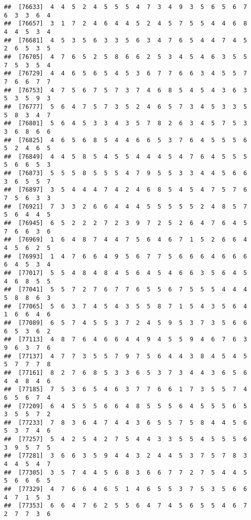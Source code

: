 \documentclass[
]{book}
\begin{document}
\begin{verbatim}
##  [76633]  4  4  5  2  4  5  5  5  4  7  3  4  9  3  5  6  5  6  7  6  3  3  6  4
##  [76657]  3  1  7  2  4  6  4  4  5  2  4  5  7  5  5  4  4  6  8  4  4  5  3  4
##  [76681]  4  5  3  5  6  3  3  5  6  3  4  7  6  5  4  4  7  4  5  2  6  5  3  5
##  [76705]  4  7  6  5  2  5  8  6  6  2  5  3  4  5  4  6  3  5  5  7  5  3  5  4
##  [76729]  4  4  6  5  6  5  4  5  3  6  7  7  6  6  3  4  5  5  7  7  6  6  7  7
##  [76753]  4  7  5  6  7  5  7  3  7  4  6  8  5  4  5  4  3  6  3  5  3  5  9  3
##  [76777]  5  6  4  7  5  7  3  5  2  4  6  5  7  3  4  5  3  3  5  5  8  3  4  7
##  [76801]  5  6  4  5  3  3  4  3  5  7  8  2  6  3  4  5  7  5  3  3  6  8  6  6
##  [76825]  4  6  5  6  8  5  4  4  6  6  5  3  7  6  4  5  5  5  6  5  2  4  6  5
##  [76849]  4  4  5  8  5  4  5  5  4  4  4  5  4  7  6  4  5  5  5  5  6  6  5  3
##  [76873]  5  5  5  8  5  5  5  4  7  9  5  5  3  3  4  4  5  6  6  3  6  5  5  7
##  [76897]  3  5  4  4  4  7  4  2  4  6  8  5  4  5  4  7  5  7  6  7  5  6  3  3
##  [76921]  7  3  3  2  6  6  4  4  4  5  5  5  5  5  2  4  8  5  7  5  6  4  4  5
##  [76945]  6  5  2  2  2  7  2  3  9  7  2  5  2  6  4  7  6  4  5  7  6  6  3  6
##  [76969]  1  6  4  8  7  4  4  7  5  6  4  6  7  1  5  2  6  6  4  4  5  6  2  5
##  [76993]  1  4  7  6  6  4  9  5  6  7  7  5  6  6  6  4  6  6  6  6  4  5  3  4
##  [77017]  5  5  4  8  4  8  4  5  6  4  5  4  6  6  3  5  6  4  5  4  6  8  5  5
##  [77041]  5  5  7  2  7  6  7  7  6  5  5  6  7  5  5  5  4  4  4  5  8  8  6  3
##  [77065]  5  6  3  7  4  5  4  3  5  5  8  7  1  5  4  3  5  6  4  1  6  6  4  6
##  [77089]  6  5  7  4  5  5  3  7  2  4  5  9  5  3  7  3  5  6  6  6  5  3  6  2
##  [77113]  4  8  7  6  4  6  6  4  4  9  4  5  5  9  4  6  7  6  3  9  6  3  7  6
##  [77137]  4  7  7  3  5  5  7  9  7  5  6  4  4  3  8  4  5  4  5  5  7  7  7  8
##  [77161]  8  2  7  6  8  5  3  3  6  5  3  7  3  4  4  3  6  5  6  4  4  8  4  6
##  [77185]  7  5  3  6  5  4  6  3  7  7  6  6  1  7  3  5  5  7  4  6  5  6  7  4
##  [77209]  6  4  5  5  5  6  6  4  8  5  5  5  6  4  5  5  5  6  5  3  5  5  7  2
##  [77233]  7  8  3  6  4  7  4  4  3  6  5  5  7  5  8  4  4  5  6  5  3  7  4  6
##  [77257]  5  4  2  5  4  2  7  5  4  4  3  3  5  5  4  5  5  5  6  3  9  5  7  5
##  [77281]  3  6  6  3  5  9  4  4  3  2  4  4  5  3  7  5  7  8  3  4  4  5  4  7
##  [77305]  3  5  7  4  4  5  6  8  3  6  6  7  7  2  7  5  4  4  5  5  6  6  6  5
##  [77329]  4  7  6  6  4  6  5  1  4  6  5  5  3  7  5  3  5  6  6  4  7  1  5  3
##  [77353]  6  6  4  7  6  2  5  5  6  4  7  4  5  6  5  5  4  6  7  2  7  7  3  6

\end{verbatim}
\end{document}
